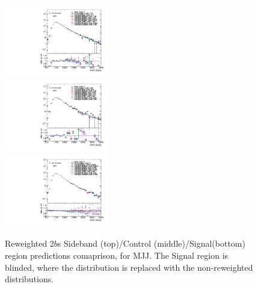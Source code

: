 \begin{figure}[htbp!]
\begin{center}
\includegraphics[angle=270, width=0.4\textwidth]{./figures/boosted/AppendixReweight/Compare/Data_TwoTag_split_Sideband_directcompare_mHH_l_1.pdf}\\
\includegraphics[angle=270, width=0.4\textwidth]{./figures/boosted/AppendixReweight/Compare/Data_TwoTag_split_Control_directcompare_mHH_l_1.pdf}\\
\includegraphics[angle=270, width=0.4\textwidth]{./figures/boosted/AppendixReweight/Compare/Data_TwoTag_split_Signal_directcompare_mHH_l_1.pdf}
\caption{Reweighted 2$b$s Sideband (top)/Control (middle)/Signal(bottom) region predictions comaprison, for MJJ. The Signal region is blinded, where the distribution is replaced with the non-reweighted distributions.}
\label{fig:app-rw-comp-2bs}
\end{center}
\end{figure}

